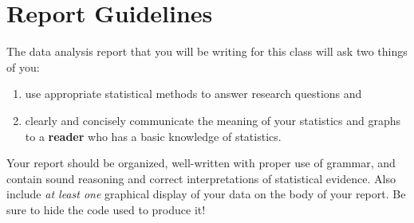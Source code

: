 \documentclass[
]{book}
\providecommand{\tightlist}{%
  \setlength{\itemsep}{0pt}\setlength{\parskip}{0pt}}
\begin{document}
\hypertarget{report-guidelines}{%
\chapter{Report Guidelines}\label{report-guidelines}}

The data analysis report that you will be writing for this class will ask two things of you:

\begin{enumerate}
\def\labelenumi{\arabic{enumi}.}
\tightlist
\item
  use appropriate statistical methods to answer research questions and
\item
  clearly and concisely communicate the meaning of your statistics and graphs to a \textbf{reader} who has a basic knowledge of statistics.
\end{enumerate}

Your report should be organized, well-written with proper use of grammar, and contain sound reasoning and correct interpretations of statistical evidence. Also include \emph{at least one} graphical display of your data on the body of your report. Be sure to hide the code used to produce it!
\end{document}
